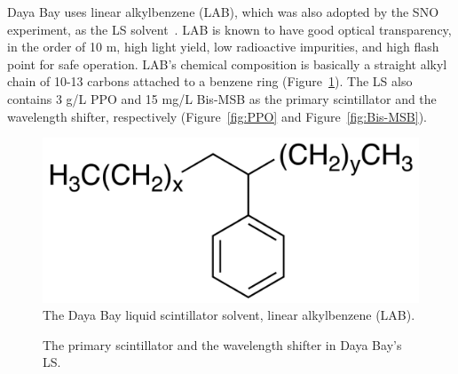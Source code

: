 Daya Bay uses linear alkylbenzene (LAB), which was also adopted by the SNO experiment, as the LS solvent~\cite{Beriguete2014}. LAB is known to have good optical transparency, in the order of 10 m, high light yield, low radioactive impurities, and high flash point for safe operation. LAB's chemical composition is basically a straight alkyl chain of 10-13 carbons attached to a benzene ring (Figure~\ref{fig:LAB}). The LS also contains 3 g/L PPO and 15 mg/L Bis-MSB as the primary scintillator and the wavelength shifter, respectively (Figure~\ref{fig:PPO} and Figure~\ref{fig:Bis-MSB}).
\begin{figure}
	\centering
	\includegraphics[width=.5\textwidth]{figures/chap3/LAB.png}
	\caption{The Daya Bay liquid scintillator solvent, linear alkylbenzene (LAB).}
	\label{fig:LAB}
\end{figure}
\begin{figure}
	\centering
  \qquad
	\caption{The primary scintillator and the wavelength shifter in Daya Bay's LS.}
\end{figure}


